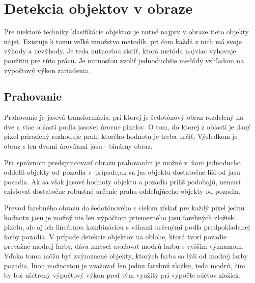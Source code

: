 \chapter{Detekcia objektov v obraze}

    Pre niektoré techniky klasifikácie objektov je nutné najprv v obraze tieto objekty nájsť. Existuje k tomu veľké množstvo metodík, pri čom každá z nich má svoje výhody a nevýhody. Je teda nutnosťou zistiť, ktorá metóda najviac vyhovuje použitiu pre túto prácu. Je nutnosťou zvoliť jednoduchšie medódy vzhľadom na výpočtový výkon zariadenia.

\section{Prahovanie}

    Prahovanie je jasová transformácia, pri ktorej je šedotónový obraz rozdelený na dve a viac oblastí podľa jasovej úrovne pixelov. O tom, do ktorej z oblastí je daný pixel priradený rozhoduje prah, ktorého hodnotu je treba určiť. Výsledkom je obraz s len dvomi úrovňami jasu - binárny obraz.

    Pri~správnom predspracovaní obrazu prahovaním je možné v~ňom jednoducho oddeliť objekty od~pozadia v~prípade,ak sa jas objektu dostatočne líši od jasu pozadia. Ak sa však jasové hodnoty objektu a pozadia príliš podobajú, nemusí existovať dostatočne robustné určenie prahu oddeľujúceho objekty od pozadia. \cite{Morse1998/1} \cite{Buhl2023}

    Prevod farebného obrazu do šedotónového s cieľom získať pre každý pixel jednu hodnotu jasu je možný nie len výpočtom priemerného jasu farebných zložiek pixelu, ale aj ich lineárnou kombináciou s váhami určenými podľa predpokladanej farby pozadia. V prípade detekcie objektov na oblohe, ktorá tvorí pozadie prevažne modrej farby, dáva zmysel uvažovať modrú farbu s vyšším významom. Vďaka tomu môžu byť zvýraznené objekty, ktorých farba sa lýši od modrej farby pozadia. Inou možnosťou je uvažovať len jednu farebnú zložku, teda modrú, čím by bol ušetrený výpočtový výkon pred tým využitý pri výpočte súčtov zložiek.


